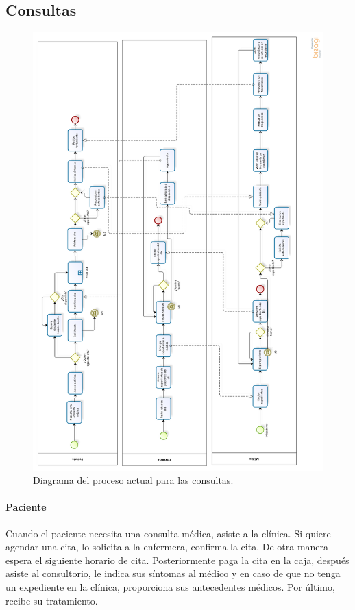 \subsection{Consultas}
\begin{figure}[htbp!]
	\centering
	\includegraphics[width=\textwidth]{images/procesos/consultas_old}
	\caption{Diagrama del proceso actual para las consultas.}
\end{figure}
\paragraph{Paciente}
Cuando el paciente necesita una consulta médica, asiste a la clínica. Si quiere agendar una cita, lo solicita a la enfermera, confirma la cita. De otra manera espera el siguiente horario de cita. Posteriormente paga la cita en la caja, después asiste al consultorio, le indica sus síntomas al médico y en caso de que no tenga un expediente en la clínica, proporciona sus antecedentes médicos. Por último, recibe su tratamiento.
